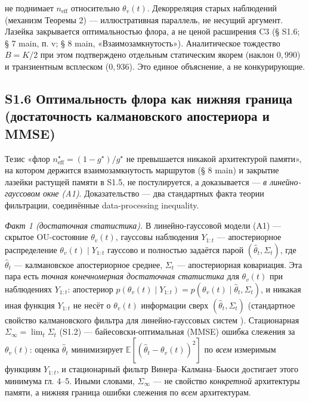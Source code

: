 \documentclass[12pt]{iopart}
\begin{document}
не поднимает \(n_{\text{eff}}\) относительно \(\theta_v(t)\). Декорреляция старых наблюдений (механизм Теоремы 2) --- иллюстративная параллель, не несущий аргумент. Лазейка закрывается оптимальностью флора, а не ценой расширения C3 (§ S1.6; § 7 main, п. v; § 8 main, «Взаимозамкнутость»). Аналитическое тождество \(B = K/2\) при этом подтверждено отдельным статическим якорем (наклон \(0{,}990\)) и транзиентным всплеском (\(0{,}936\)). Это единое объяснение, а не конкурирующие.



\subsection{S1.6 Оптимальность флора как нижняя граница (достаточность калмановского апостериора и MMSE)}\label{s1.6-ux43eux43fux442ux438ux43cux430ux43bux44cux43dux43eux441ux442ux44c-ux444ux43bux43eux440ux430-ux43aux430ux43a-ux43dux438ux436ux43dux44fux44f-ux433ux440ux430ux43dux438ux446ux430-ux434ux43eux441ux442ux430ux442ux43eux447ux43dux43eux441ux442ux44c-ux43aux430ux43bux43cux430ux43dux43eux432ux441ux43aux43eux433ux43e-ux430ux43fux43eux441ux442ux435ux440ux438ux43eux440ux430-ux438-mmse}



Тезис «флор \(n_{\text{eff}}^\star = (1-g^\star)/g^\star\) не превышается никакой архитектурой памяти», на котором держится взаимозамкнутость маршрутов (§ 8 main) и закрытие лазейки растущей памяти в S1.5, не постулируется, а доказывается --- \emph{в линейно-гауссовом окне (A1)}. Доказательство --- два стандартных факта теории фильтрации, соединённые data-processing inequality.



\emph{Факт 1 (достаточная статистика).} В линейно-гауссовой модели (A1) --- скрытое OU-состояние \(\theta_v(t)\), гауссовы наблюдения \(Y_{1:t}\) --- апостериорное распределение \(\theta_v(t)\mid Y_{1:t}\) гауссово и полностью задаётся парой \((\hat\theta_t,\Sigma_t)\), где \(\hat\theta_t\) --- калмановское апостериорное среднее, \(\Sigma_t\) --- апостериорная ковариация. Эта пара есть \emph{точная конечномерная достаточная статистика} для \(\theta_v(t)\) при наблюдениях \(Y_{1:t}\): апостериор \(p(\theta_v(t)\mid Y_{1:t}) = p(\theta_v(t)\mid \hat\theta_t,\Sigma_t)\), и никакая иная функция \(Y_{1:t}\) не несёт о \(\theta_v(t)\) информации сверх \((\hat\theta_t,\Sigma_t)\) (стандартное свойство калмановского фильтра для линейно-гауссовых систем \cite{AndersonMoore1979,KalmanBucy1961}). Стационарная \(\Sigma_\infty = \lim_t\Sigma_t\) (S1.2) --- байесовски-оптимальная (MMSE) ошибка слежения за \(\theta_v(t)\): оценка \(\hat\theta_t\) минимизирует \(\mathbb E[(\hat\theta_t-\theta_v(t))^2]\) по \emph{всем} измеримым функциям \(Y_{1:t}\), и стационарный фильтр Винера--Калмана--Бьюси достигает этого минимума \cite{AndersonMoore1979} гл. 4--5. Иными словами, \(\Sigma_\infty\) --- не свойство \emph{конкретной} архитектуры памяти, а нижняя граница ошибки слежения по \emph{всем} архитектурам.
\end{document}
